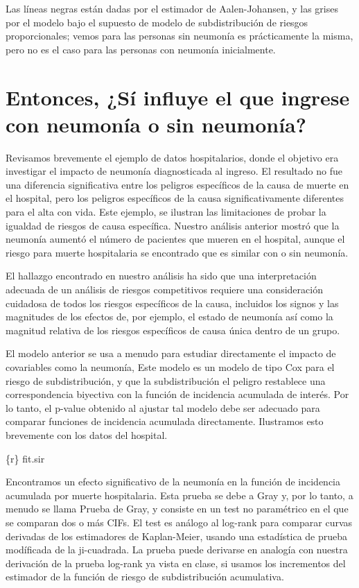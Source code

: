 \documentclass[
]{article}
\begin{document}
Las líneas negras están dadas por el estimador de Aalen-Johansen, y las
grises por el modelo bajo el supuesto de modelo de subdistribución de
riesgos proporcionales; vemos para las personas sin neumonía es
prácticamente la misma, pero no es el caso para las personas con
neumonía inicialmente.

\hypertarget{entonces-suxed-influye-el-que-ingrese-con-neumonuxeda-o-sin-neumonuxeda}{%
\section{Entonces, ¿Sí influye el que ingrese con neumonía o sin
neumonía?}\label{entonces-suxed-influye-el-que-ingrese-con-neumonuxeda-o-sin-neumonuxeda}}

Revisamos brevemente el ejemplo de datos hospitalarios, donde el
objetivo era investigar el impacto de neumonía diagnosticada al ingreso.
El resultado no fue una diferencia significativa entre los peligros
específicos de la causa de muerte en el hospital, pero los peligros
específicos de la causa significativamente diferentes para el alta con
vida. Este ejemplo, se ilustran las limitaciones de probar la igualdad
de riesgos de causa específica. Nuestro análisis anterior mostró que la
neumonía aumentó el número de pacientes que mueren en el hospital,
aunque el riesgo para muerte hospitalaria se encontrado que es similar
con o sin neumonía.

El hallazgo encontrado en nuestro análisis ha sido que una
interpretación adecuada de un análisis de riesgos competitivos requiere
una consideración cuidadosa de todos los riesgos específicos de la
causa, incluidos los signos y las magnitudes de los efectos de, por
ejemplo, el estado de neumonía así como la magnitud relativa de los
riesgos específicos de causa única dentro de un grupo.

El modelo anterior se usa a menudo para estudiar directamente el impacto
de covariables como la neumonía, Este modelo es un modelo de tipo Cox
para el riesgo de subdistribución, y que la subdistribución el peligro
restablece una correspondencia biyectiva con la función de incidencia
acumulada de interés. Por lo tanto, el p-value obtenido al ajustar tal
modelo debe ser adecuado para comparar funciones de incidencia acumulada
directamente. Ilustramos esto brevemente con los datos del hospital.

\{r\} fit.sir

Encontramos un efecto significativo de la neumonía en la función de
incidencia acumulada por muerte hospitalaria. Esta prueba se debe a Gray
y, por lo tanto, a menudo se llama Prueba de Gray, y consiste en un test
no paramétrico en el que se comparan dos o más CIFs. El test es análogo
al log-rank para comparar curvas derivadas de los estimadores de
Kaplan-Meier, usando una estadística de prueba modíficada de la
ji-cuadrada. La prueba puede derivarse en analogía con nuestra
derivación de la prueba log-rank ya vista en clase, si usamos los
incrementos del estimador de la función de riesgo de subdistribución
acumulativa.
\end{document}
